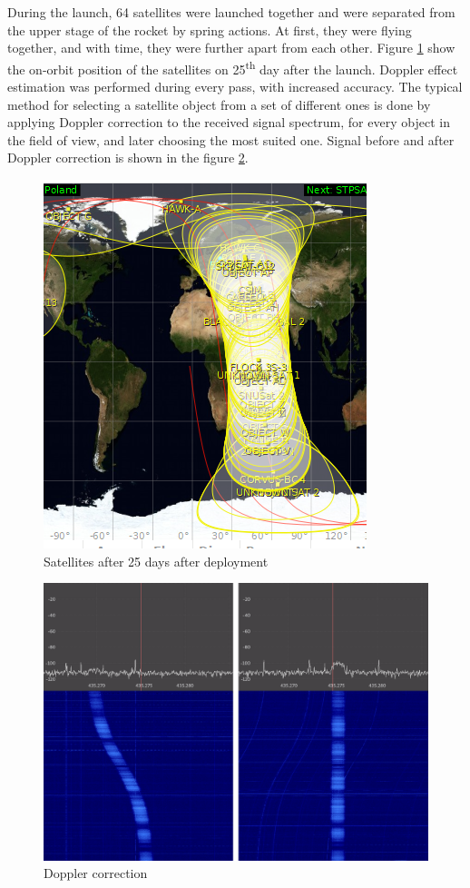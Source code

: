 During the launch, \si{64} satellites were launched together and were separated from the upper stage of the rocket by spring actions. At first, they were flying together, and with time, they were further apart from each other. Figure \ref{25_days} show the on-orbit position of the satellites on \si{25^{th}} day after the launch. Doppler effect estimation was performed during every pass, with increased accuracy. The typical method for selecting a satellite object from a set of different ones is done by applying Doppler correction to the received signal spectrum, for every object in the field of view, and later choosing the most suited one. Signal before and after Doppler correction is shown in the figure \ref{Doppler_correction_gqrx}.

\begin{figure}[H]
    \centering
    \includegraphics[width=0.4\paperwidth]{img/9/25_days.png}
    \caption{Satellites after \si{25} days after deployment}
    \label{25_days}
\end{figure}

\begin{figure}[H]
    \centering
    \includegraphics[width=0.5\paperwidth]{img/9/doppler_correction.png}
    \caption{Doppler correction}
    \label{Doppler_correction_gqrx}
\end{figure}

